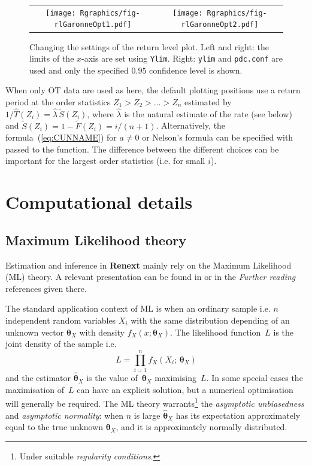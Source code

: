 \documentclass[a4paper]{report}
\newcommand{\bs}{\boldsymbol}
\begin{document}
\begin{figure}
   \centering
   \begin{tabular}{c c} 
     \texttt{[image: Rgraphics/fig-rlGaronneOpt1.pdf]} &
     \texttt{[image: Rgraphics/fig-rlGaronneOpt2.pdf]} 
   \end{tabular}
   \caption{\label{RLP2}Changing the settings of the return level plot. 
     Left and right: the limits of the $x$-axis are set using \texttt{Ylim}. 
     Right: \texttt{ylim} and \texttt{pdc.conf} are used and only the 
     specified $0.95$ confidence level is shown.}
\end{figure}


When only OT data are used as here, the default plotting positions use
a return period at the order statistics $Z_1 > Z_2 > \dots > Z_n$ estimated by $1 /
\widehat{T}(Z_i) = \widehat{\lambda} \,\widetilde{S}(Z_i)$, where
$\widehat{\lambda}$ is the natural estimate of the rate (see below)
and $\widetilde{S}(Z_i) = 1 - \widetilde{F}(Z_i) = i / (n +1)$. 
Alternatively, the \verb@ppoints@ formula~(\ref{eq:CUNNAME}) for $a \neq 0$ or Nelson's 
formula \citep{Nelson} can be specified with \verb@plotOptions@ passed
to the \verb@SandT@ function. The difference between the different choices
can be important for the largest order statistics (i.e. for small $i$).




\section{Computational details}
\subsection{Maximum Likelihood theory}
Estimation and inference in \textbf{Renext} mainly
rely on the Maximum Likelihood (ML) theory. A relevant presentation can be found
in \citet[chap.~2]{COLES} or in the \textit{Further reading}
references given there.

The standard application context of ML is when an ordinary sample i.e. 
$n$ independent random variables $X_i$ with the same distribution depending 
of an unknown vector $\bs{\theta}_X$ with density $f_X(x;\bs{\theta}_X)$. 
The likelihood function~$L$ is the joint density of the sample i.e.
$$
   L = \prod_{i=1}^n f_X(X_i;\,\bs{\theta}_X)
$$
and the estimator $\widehat{\bs{\theta}}_X$ is the value of~$\bs{\theta}_X$ 
maximising~$L$.
In some special cases the maximisation of~$L$ can have an explicit solution,
but a numerical optimisation will generally be required. The ML theory
warrants\footnote{Under suitable \textit{regularity conditions}.} the
\textit{asymptotic unbiasedness} and \textit{asymptotic normality}: 
when $n$ is large $\widehat{\bs{\theta}}_X$ has its expectation approximately 
equal to the true unknown $\bs{\theta}_X$, and it is approximately normally distributed.    
\end{document}
